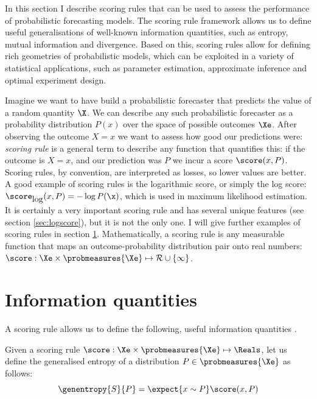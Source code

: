 In this section I describe scoring rules that can be used to assess the performance of probabilistic forecasting models. The scoring rule framework allows us to define useful generalisations of well-known information quantities, such as entropy, mutual information and divergence. Based on this, scoring rules allow for defining rich geometries of probabilistic models, which can be exploited in a variety of statistical applications, such as parameter estimation, approximate inference and optimal experiment design.

Imagine we want to have build a probabilistic forecaster that predicts the value of a random quantity $\X$. We can describe any such probabilistic forecaster as a probability distribution $P(x)$ over the space of possible outcomes $\Xe$. After observing the outcome $X=x$ we want to assess how good our predictions were: \emph{scoring rule} is a general term to describe any function that quantifies this: if the outcome is $X=x$, and our prediction was $P$ we incur a score $\score (x,P)$. Scoring rules, by convention, are interpreted as losses, so lower values are better. A good example of scoring rules is the logarithmic score, or simply the log score: $\score_{\mbox{log}}(x,P) = -\log P(\x)$, which is used in maximum likelihood estimation. It is certainly a very important scoring rule and has several unique features (see section \ref{sec:logscore}), but it is not the only one. I will give further examples of scoring rules in section \ref{}. Mathematically, a scoring rule is any measurable function that maps an outcome-probability distribution pair onto real numbers: $\score:\Xe\times\probmeasures{\Xe}\mapsto\mathcal{R}\cup\{\infty\}$.

\section{Information quantities}

A scoring rule allows us to define the following, useful information quantities \cite[see also][]{Blaetal2332}.

\begin{definition}
Given a scoring rule $\score:\Xe\times\probmeasures{\Xe}\mapsto\Reals$, let us define the generalised entropy of a distribution $P\in\probmeasures{\Xe}$ as follows:
\begin{equation}
	\genentropy{S}{P}= \expect{x\sim P} \score(x,P)
\end{equation}
\end{definition}


